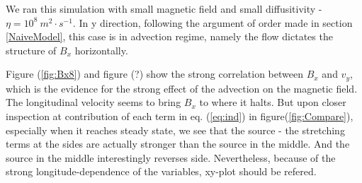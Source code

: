 \documentclass[11pt]{article}
\begin{document}
We ran this simulation with small magnetic field and small diffusitivity - $\eta = 10^{8} \ m^2 \cdot s^{-1}$. In y direction, following the argument of order made in section \ref{NaiveModel}, this case is in advection regime, namely the flow dictates the structure of $B_x$ horizontally. 

Figure (\ref{fig:Bx8}) and figure (?) show the strong correlation between $B_x$ and $v_y$, which is the evidence for the strong effect of the advection on the magnetic field. The longitudinal velocity seems to bring $B_x$ to where it halts. But upon closer inspection at contribution of each term in eq. (\ref{eq:ind}) in figure(\ref{fig:Compare}), especially when it reaches steady state, we see that the source - the stretching terms at the sides are actually stronger than the source in the middle. And the source in the middle interestingly reverses side. Nevertheless, because of the strong longitude-dependence of the variables, xy-plot should be refered. 
\end{document}
